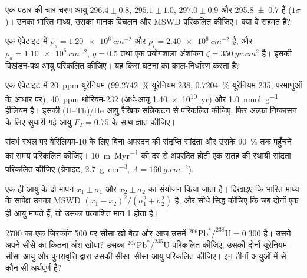 \begin{exercise}[$\star\star$]\label{exo:b3:advanced-geochronology:6}
एक पठार की चार चरण-आयु $296.4 \pm 0.8$, $295.1 \pm 1.0$, $297.0 \pm
0.9$ और \qty[separate-uncertainty=true]{295.8 \pm 0.7}{\Ma} हैं ($1\sigma$)। उनका भारित माध्य,
उसका मानक विचलन और MSWD परिकलित कीजिए। क्या वे सहमत हैं?
\end{exercise}

\begin{exercise}[$\star\star$]\label{exo:b3:advanced-geochronology:7}
एक ऐपेटाइट में $\rho_s = \qty{1.20e6}{cm^{-2}}$ और $\rho_i =
\qty{2.40e6}{cm^{-2}}$ है, और $\rho_d = \qty{1.10e6}{cm^{-2}}$, $g = 0.5$ तथा एक
प्रयोगशाला अंशांकन $\zeta = \qty{350}{yr.cm^2}$ है। इसकी विखंडन-पथ
आयु परिकलित कीजिए। यह किस घटना का काल-निर्धारण करता है?
\end{exercise}

\begin{exercise}[$\star\star$]\label{exo:b3:advanced-geochronology:8}
एक ऐपेटाइट में \qty{20}{ppm} यूरेनियम (\qty{99.2742}{\percent}
यूरेनियम-238, \qty{0.7204}{\percent} यूरेनियम-235, परमाणुओं के आधार पर), \qty{40}{ppm}
थोरियम-232 (अर्ध-आयु \qty{1.40e10}{yr}) और \qty{1.0}{nmol.g^{-1}} हीलियम है।
इसकी (U--Th)/He आयु रैखिक सन्निकटन से परिकलित कीजिए, फिर
अल्फ़ा निष्कासन के लिए सुधारी गई आयु $F_T = 0.75$ के साथ ज्ञात कीजिए।
\end{exercise}

\begin{exercise}[$\star\star$]\label{exo:b3:advanced-geochronology:9}
संदर्भ स्थल पर बेरिलियम-10 के लिए बिना अपरदन की संतृप्ति सांद्रता
और उसके \qty{90}{\percent} तक पहुँचने का समय परिकलित कीजिए।
\qty{10}{m.Myr^{-1}} की दर से अपरदित होती एक सतह की स्थायी सांद्रता परिकलित कीजिए (ग्रेनाइट,
\qty{2.7}{g.cm^{-3}}, $\Lambda = \qty{160}{g.cm^{-2}}$).
\end{exercise}

\begin{exercise}[$\star\star\star$]\label{exo:b3:advanced-geochronology:10}
एक ही आयु के दो मापन $x_1 \pm \sigma_1$ और $x_2 \pm \sigma_2$ का
संयोजन किया जाता है। दिखाइए कि भारित माध्य के सापेक्ष उनका MSWD
$(x_1 - x_2)^2/(\sigma_1^2 + \sigma_2^2)$ है, और सीधे सिद्ध कीजिए कि जब
दोनों एक ही आयु मापते हैं, तो उसका प्रत्याशित मान 1 होता है।
\end{exercise}

\begin{exercise}[$\star\star\star$]\label{exo:b3:advanced-geochronology:11}
\qty{2700}{\Ma} का एक ज़िरकॉन \qty{500}{\Ma} पर सीसा खो बैठा और आज
उसमें $^{206}\mathrm{Pb}^*/^{238}\mathrm{U} = 0.300$ है। उसने अपने सीसे का कितना अंश
खोया? उसका $^{207}\mathrm{Pb}^*/^{235}\mathrm{U}$ परिकलित कीजिए, उसकी दोनों यूरेनियम--सीसा
आयु और पुनरावृत्ति द्वारा उसकी सीसा--सीसा आयु परिकलित कीजिए। इन तीनों आयुओं में से
कौन-सी अर्थपूर्ण है?
\end{exercise}

